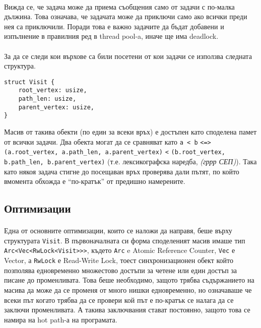 \paragraph*{} Вижда се, че задача може да приема съобщения само от задачи с по-малка дължина. Това означава, че задачата може да приключи само ако всички преди нея са приключили. Поради това е важно задачите да бъдат добавени и изпълнение в правилния ред в thread pool-a, иначе ще има deadlock.

\paragraph*{} За да се следи кои върхове са били посетени от кои задачи се използва следната структура.
\begin{verbatim}
struct Visit {
    root_vertex: usize,
    path_len: usize,
    parent_vertex: usize,
}
\end{verbatim}
Масив от такива обекти (по един за всеки връх) е достъпен като споделена памет от всички задачи. Два обекта могат да се сравняват като \verb|a < b| \verb|<=>| \verb|(a.root_vertex, a.path_len, a.parent_vertex)| \verb|<| \verb|(b.root_vertex, b.path_len, b.parent_vertex)| (т.е. лексикографска наредба, \emph{(гррр СЕП)}). Така като някоя задача стигне до посещаван връх проверява дали пътят, по който вмомента обхожда е ``по-кратък'' от предишно намерените.

\subsection*{Оптимизации}

\paragraph*{} Една от основните оптимизации, които се наложи да направя, беше върху структурата \verb|Visit|. В първоначалната си форма споделеният масив имаше тип \verb|Arc<Vec<RwLock<Visit>>>|, където \verb|Arc| e Atomic Reference Counter, \verb|Vec| е Vector, а \verb|RwLock| е Read-Write Lock, тоест синхронизационен обект който позполява едновременно множестово достъпи за четене или един достъп за писане до променливата. Това беше необходимо, защото трябва съдържанието на масива да може да се променя от много нишки едновременно, но означаваше че всеки път когато трябва да се провери кой път е по-кратък се налага да се заключи променливата. А такива заключвания стават постоянно, защото това се намира на hot path-а на програмата.

